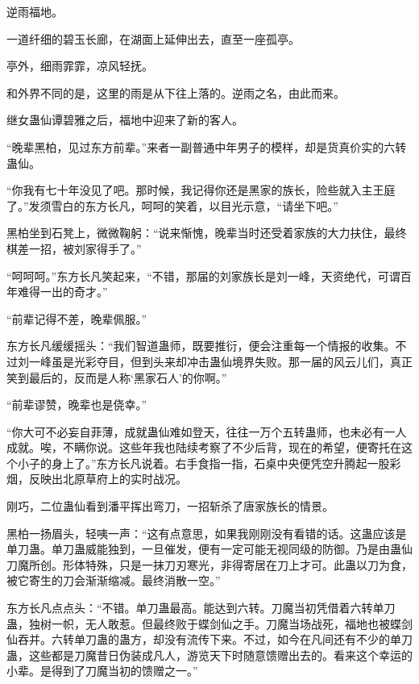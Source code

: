 
\begin{this_body}



逆雨福地。

一道纤细的碧玉长廊，在湖面上延伸出去，直至一座孤亭。

亭外，细雨霏霏，凉风轻抚。

和外界不同的是，这里的雨是从下往上落的。逆雨之名，由此而来。

继女蛊仙谭碧雅之后，福地中迎来了新的客人。

“晚辈黑柏，见过东方前辈。”来者一副普通中年男子的模样，却是货真价实的六转蛊仙。

“你我有七十年没见了吧。那时候，我记得你还是黑家的族长，险些就入主王庭了。”发须雪白的东方长凡，呵呵的笑着，以目光示意，“请坐下吧。”

黑柏坐到石凳上，微微鞠躬：“说来惭愧，晚辈当时还受着家族的大力扶住，最终棋差一招，被刘家得手了。”

“呵呵呵。”东方长凡笑起来，“不错，那届的刘家族长是刘一峰，天资绝代，可谓百年难得一出的奇才。”

“前辈记得不差，晚辈佩服。”

东方长凡缓缓摇头：“我们智道蛊师，既要推衍，便会注重每一个情报的收集。不过刘一峰虽是光彩夺目，但到头来却冲击蛊仙境界失败。那一届的风云儿们，真正笑到最后的，反而是人称‘黑家石人’的你啊。”

“前辈谬赞，晚辈也是侥幸。”

“你大可不必妄自菲薄，成就蛊仙难如登天，往往一万个五转蛊师，也未必有一人成就。唉，不瞒你说。这些年我也陆续考察了不少后背，现在的希望，便寄托在这个小子的身上了。”东方长凡说着。右手食指一指，石桌中央便凭空升腾起一股彩烟，反映出北原草府上的实时战况。

刚巧，二位蛊仙看到潘平挥出弯刀，一招斩杀了唐家族长的情景。

黑柏一扬眉头，轻咦一声：“这有点意思，如果我刚刚没有看错的话。这蛊应该是单刀蛊。单刀蛊威能独到，一旦催发，便有一定可能无视同级的防御。乃是由蛊仙刀魔所创。形体特殊，只是一抹刀刃寒光，非得寄居在刀上才可。此蛊以刀为食，被它寄生的刀会渐渐缩减。最终消散一空。”

东方长凡点点头：“不错。单刀蛊最高。能达到六转。刀魔当初凭借着六转单刀蛊，独树一帜，无人敢惹。但最终败于蝶剑仙之手。刀魔当场战死，福地也被蝶剑仙吞并。六转单刀蛊的蛊方，却没有流传下来。不过，如今在凡间还有不少的单刀蛊，这些都是刀魔昔日伪装成凡人，游览天下时随意馈赠出去的。看来这个幸运的小辈。是得到了刀魔当初的馈赠之一。”


\end{this_body}
